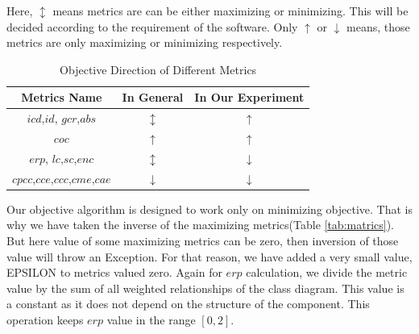 \documentclass[letterpaper, 10 pt, conference]{ieeeconf}  %
\begin{document}
Here, $\updownarrow$ means metrics are can  be either maximizing or minimizing. This will be decided according to the requirement of the software. Only $\uparrow$ or $\downarrow$ means, those metrics are only maximizing or minimizing respectively.  
\begin{table}[!h] \label{tab:matrics}
\caption{Objective Direction of Different Metrics}

\begin{center}

\begin{tabular}{ |c|c|c| } 



 \hline
 Metrics Name & In General & In Our Experiment\\ \hline
$icd$,$id$, $gcr$,$abs$ &  $\updownarrow$  & $\uparrow$ \\ \hline
$coc$ & $\uparrow$ &  $\uparrow$ \\ \hline
$erp$, $lc$,$sc$,$enc$  & $\updownarrow$ &  $\downarrow$\\ \hline
$cpcc$,$cce$,$ccc$,$cme$,$cae$ & \textbf{$\downarrow$} & $\downarrow$ \\ \hline


\end{tabular}

\end{center}
\label{tb:metrics table}

\end{table}
Our objective algorithm is designed to work only on minimizing objective. That is why we have taken the inverse of the maximizing metrics(Table \ref{tab:matrics}). But here value of some maximizing metrics can be zero, then inversion of those value will throw an Exception. For that reason, we have added a very small value, EPSILON to metrics valued zero. Again for $erp$ calculation, we divide the metric value by the sum of all weighted relationships of the class diagram. This value is a constant as it does not depend on the structure of the component. This operation keeps $erp$ value in the range $ [0,2] $.\\
\end{document}
